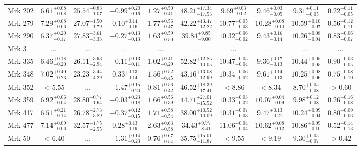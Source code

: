\documentclass[onecolumn]{mn2e}
\begin{document}
\begin{landscape}
{\begin{center}
\begin{longtable}{lccccccccc}
Mrk 202 & $6.61_{-0.08}^{+0.08}$ & $25.54_{-1.07}^{+0.83}$ & $-0.99_{-0.16}^{+0.20}$ & $1.27_{-0.41}^{+0.50}$ &$48.21_{-17.53}^{+17.34}$ & $9.69_{-0.02}^{+0.03}$ & $9.46_{-0.05}^{+0.03}$ & $9.31_{-0.05}^{+0.11}$ & $0.22_{-0.05}^{+0.11}$ \\
Mrk 279 & $7.29_{-0.06}^{+0.08}$ & $27.07_{-1.79}^{+1.50}$ & $0.10_{-0.16}^{+0.14}$ & $1.77_{-0.47}^{+0.56}$ &$42.22_{-12.22}^{+13.47}$ & $10.77_{-0.03}^{+0.05}$ & $10.28_{-0.10}^{+0.08}$ & $10.59_{-0.07}^{+0.10}$ & $0.56_{-0.11}^{+0.12}$ \\
Mrk 290 & $6.37_{-0.17}^{+0.20}$ & $27.83_{-3.33}^{+3.61}$ & $-0.27_{-0.13}^{+0.13}$ & $1.63_{-0.50}^{+0.59}$ &$39.84_{-9.00}^{+9.85}$ & $10.32_{-0.02}^{+0.06}$ & $9.43_{-0.14}^{+0.16}$ & $10.26_{-0.04}^{+0.08}$ & $0.83_{-0.07}^{+0.06}$ \\
Mrk 3 & ... & ... & ... & ... &... & ... & ... & ... & ... \\
Mrk 335 & $6.46_{-0.20}^{+0.18}$ & $26.11_{-2.94}^{+3.93}$ & $-0.11_{-0.11}^{+0.13}$ & $1.02_{-0.29}^{+0.41}$ &$52.82_{-10.05}^{+12.85}$ & $10.47_{-0.04}^{+0.05}$ & $9.36_{-0.13}^{+0.17}$ & $10.44_{-0.05}^{+0.05}$ & $0.90_{-0.05}^{+0.03}$ \\
Mrk 348 & $7.02_{-0.23}^{+0.40}$ & $23.23_{-4.29}^{+3.44}$ & $0.33_{-0.14}^{+0.13}$ & $1.56_{-0.45}^{+0.52}$ &$43.16_{-12.99}^{+13.08}$ & $10.34_{-0.02}^{+0.06}$ & $9.61_{-0.13}^{+0.14}$ & $10.25_{-0.06}^{+0.08}$ & $0.75_{-0.10}^{+0.08}$ \\
Mrk 352 & $<5.55$ & ... & $-1.47_{-0.20}^{+0.15}$ & $0.81_{-0.42}^{+0.56}$ &$46.52_{-17.41}^{+18.39}$ & $<8.86$ & $<8.34$ & $8.70_{-0.08}^{+0.05}$ & $>0.60$ \\
Mrk 359 & $6.92_{-0.04}^{+0.06}$ & $28.80_{-1.64}^{+0.77}$ & $-0.03_{-0.18}^{+0.23}$ & $1.66_{-0.39}^{+0.56}$ &$44.71_{-15.52}^{+27.01}$ & $10.33_{-0.02}^{+0.03}$ & $10.07_{-0.09}^{+0.04}$ & $9.98_{-0.08}^{+0.12}$ & $0.26_{-0.08}^{+0.16}$ \\
Mrk 417 & $6.51_{-0.14}^{+0.21}$ & $26.78_{-3.89}^{+2.73}$ & $-0.37_{-0.15}^{+0.12}$ & $1.71_{-0.54}^{+0.58}$ &$38.00_{-10.09}^{+10.52}$ & $10.31_{-0.03}^{+0.07}$ & $9.47_{-0.21}^{+0.13}$ & $10.24_{-0.04}^{+0.09}$ & $0.80_{-0.06}^{+0.09}$ \\
Mrk 477 & $7.14_{-0.06}^{+0.09}$ & $32.57_{-2.55}^{+1.75}$ & $0.28_{-0.19}^{+0.13}$ & $2.63_{-0.58}^{+0.63}$ &$34.43_{-8.41}^{+9.77}$ & $11.06_{-0.04}^{+0.04}$ & $10.62_{-0.12}^{+0.08}$ & $10.86_{-0.10}^{+0.09}$ & $0.52_{-0.13}^{+0.14}$ \\
Mrk 50 & $<6.40$ & ... & $-1.31_{-0.23}^{+0.14}$ & $0.76_{-0.54}^{+0.67}$ &$35.75_{-11.87}^{+15.01}$ & $<9.55$ & $<9.19$ & $9.30_{-0.07}^{+0.05}$ & $>0.42$ \\

\end{longtable}
\end{center}}
\end{landscape}
\end{document}
